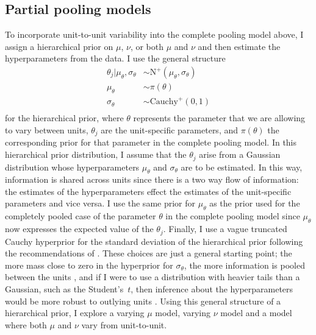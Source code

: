 \subsection{Partial pooling models} \label{subsec:partial-pooling}

To incorporate unit-to-unit variability into the complete pooling model above, I assign a hierarchical prior on $\mu$, $\nu$, or both $\mu$ and $\nu$ and then estimate the hyperparameters from the data. I use the general structure
\begin{align*}
   \theta_j| \mu_\theta, \sigma_\theta & \sim \mbox{N}^{+}(\mu_\theta, \sigma_\theta) \\
   \mu_\theta & \sim \pi(\theta)\\
   \sigma_\theta & \sim \mbox{Cauchy}^{+}(0, 1) \\
\end{align*}
for the hierarchical prior, where $\theta$ represents the parameter that we are allowing to vary between units, $\theta_j$ are the unit-specific parameters, and $\pi(\theta)$ the corresponding prior for that parameter in the complete pooling model. In this hierarchical prior distribution, I assume that the $\theta_j$ arise from a Gaussian distribution whose hyperparameters $\mu_\theta$ and $\sigma_\theta$ are to be estimated. In this way, information is shared across units since there is a two way flow of information: the estimates of the hyperparameters effect the estimates of the unit-specific parameters and vice versa. I use the same prior for $\mu_\theta$ as the prior used for the completely pooled case of the parameter $\theta$ in the complete pooling model since $\mu_\theta$ now expresses the expected value of the $\theta_j$. Finally, I use a vague truncated Cauchy hyperprior for the standard deviation of the hierarchical prior following the recommendations of \citet[chap.~17]{BDA2020}. These choices are just a general starting point; the more mass close to zero in the hyperprior for $\sigma_\theta$, the more information is pooled between the units \citep{McElreath_2020}, and if I were to use a distribution with heavier tails than a Gaussian, such as the Student's~$t$, then inference about the hyperparameters would be more robust to outlying units \citep[chap.~17]{BDA2020}. Using this general structure of a hierarchical prior, I explore a varying $\mu$ model, varying $\nu$ model and a model where both $\mu$ and $\nu$ vary from unit-to-unit.

